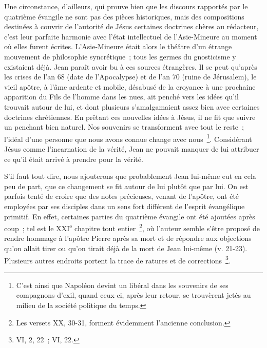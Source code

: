 \documentclass[french,twoside]{book} %
\begin{document}
Une circonstance, d’ailleurs, qui prouve bien que les discours rapportés par le quatrième évangile ne sont pas des pièces historiques, mais des compositions destinées à couvrir de l’autorité de Jésus certaines doctrines chères au rédacteur, c’est leur parfaite harmonie avec l’état intellectuel de l’Asie-Mineure au moment où elles furent écrites. L’Asie-Mineure était alors le théâtre d’un étrange mouvement de philosophie syncrétique ; tous les germes du gnosticisme y existaient déjà. Jean paraît avoir bu à ces sources étrangères. Il se peut qu’après les crises de l’an 68 (date de l’Apocalypse) et de l’an 70 (ruine de Jérusalem), le vieil apôtre, à l’âme ardente et mobile, désabusé de la croyance à une prochaine apparition du Fils de l’homme dans les nues, ait penché vers les idées qu’il trouvait autour de lui, et dont plusieurs s’amalgamaient assez bien avec certaines doctrines chrétiennes. En prêtant ces nouvelles idées à Jésus, il ne fit que suivre un penchant bien naturel. Nos souvenirs se transforment avec tout le reste ; l’idéal d’une personne que nous avons connue change avec nous \footnote{C’est ainsi que Napoléon devint un libéral dans les souvenirs de ses compagnons d’exil, quand ceux-ci, après leur retour, se trouvèrent jetés au milieu de la société politique du temps.}. Considérant Jésus comme l’incarnation de la vérité, Jean ne pouvait manquer de lui attribuer ce qu’il était arrivé à prendre pour la vérité.\par
S’il faut tout dire, nous ajouterons que probablement Jean lui-même eut en cela peu de part, que ce changement se fit autour de lui plutôt que par lui. On est parfois tenté de croire que des notes précieuses, venant de l’apôtre, ont été employées par ses disciples dans un sens fort différent de l’esprit évangélique primitif. En effet, certaines parties du quatrième évangile ont été ajoutées après coup ; tel est le XXI\textsuperscript{e} chapitre tout entier \footnote{Les versets XX, 30-31, forment évidemment l’ancienne conclusion.}, où l’auteur semble s’être proposé de rendre hommage à l’apôtre Pierre après sa mort et de répondre aux objections qu’on allait tirer ou qu’on tirait déjà de la mort de Jean lui-même (v. 21-23). Plusieurs autres endroits portent la trace de ratures et de corrections \footnote{VI, 2, 22 ; VI, 22.}.\par
\end{document}
